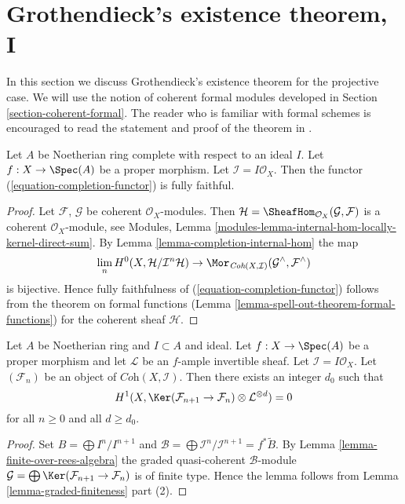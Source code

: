 \section{Grothendieck's existence theorem, I}
\label{section-existence}

\noindent
In this section we discuss Grothendieck's existence theorem for the
projective case. We will use the notion of coherent formal modules
developed in Section \ref{section-coherent-formal}. The reader who is familiar
with formal schemes is encouraged to read the statement and proof
of the theorem in \cite{EGA}.

\begin{lemma}
\label{lemma-fully-faithful}
Let $A$ be Noetherian ring complete with respect to an ideal $I$.
Let $f : X \to \Spec(A)$ be a proper morphism. Let
$\mathcal{I} = I\mathcal{O}_X$.
Then the functor (\ref{equation-completion-functor}) is fully faithful.
\end{lemma}

\begin{proof}
Let $\mathcal{F}$, $\mathcal{G}$ be coherent $\mathcal{O}_X$-modules.
Then $\mathcal{H} = \SheafHom_{\mathcal{O}_X}(\mathcal{G}, \mathcal{F})$
is a coherent $\mathcal{O}_X$-module, see
Modules, Lemma \ref{modules-lemma-internal-hom-locally-kernel-direct-sum}.
By Lemma \ref{lemma-completion-internal-hom} the map
$$
\lim_n H^0(X, \mathcal{H}/\mathcal{I}^n\mathcal{H})
\to
\Mor_{\textit{Coh}(X, \mathcal{I})}
(\mathcal{G}^\wedge, \mathcal{F}^\wedge)
$$
is bijective. Hence fully faithfulness of
(\ref{equation-completion-functor}) follows from the theorem on formal
functions (Lemma \ref{lemma-spell-out-theorem-formal-functions})
for the coherent sheaf $\mathcal{H}$.
\end{proof}

\begin{lemma}
\label{lemma-vanishing-projective}
Let $A$ be Noetherian ring and $I \subset A$ and ideal.
Let $f : X \to \Spec(A)$ be a proper morphism and let
$\mathcal{L}$ be an $f$-ample invertible sheaf. Let
$\mathcal{I} = I\mathcal{O}_X$. Let $(\mathcal{F}_n)$ be an
object of $\textit{Coh}(X, \mathcal{I})$. Then there exists an
integer $d_0$ such that
$$
H^1(X, \Ker(\mathcal{F}_{n + 1} \to \mathcal{F}_n)
\otimes \mathcal{L}^{\otimes d} )
= 0
$$
for all $n \geq 0$ and all $d \geq d_0$.
\end{lemma}

\begin{proof}
Set $B = \bigoplus I^n/I^{n + 1}$ and
$\mathcal{B} = \bigoplus \mathcal{I}^n/\mathcal{I}^{n + 1} = f^*\widetilde{B}$.
By Lemma \ref{lemma-finite-over-rees-algebra} the graded quasi-coherent
$\mathcal{B}$-module
$\mathcal{G} = \bigoplus \Ker(\mathcal{F}_{n + 1} \to \mathcal{F}_n)$
is of finite type. Hence the lemma follows from
Lemma \ref{lemma-graded-finiteness} part (2).
\end{proof}


